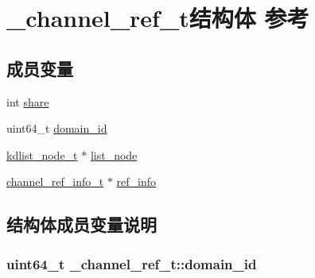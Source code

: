 \hypertarget{a00005}{}\section{\+\_\+channel\+\_\+ref\+\_\+t结构体 参考}
\label{a00005}
\subsection*{成员变量}
\begin{DoxyCompactItemize}
\item 
int \hyperlink{a00005_a6fbc267d43e4e1b98e5dbbbd25fc77f5_a6fbc267d43e4e1b98e5dbbbd25fc77f5}{share}
\item 
uint64\+\_\+t \hyperlink{a00005_a2d8872b940a96f84e2f704ac3d4a1197_a2d8872b940a96f84e2f704ac3d4a1197}{domain\+\_\+id}
\item 
\hyperlink{a00056_ac701f00a0851c97467ae35c382b316b7_ac701f00a0851c97467ae35c382b316b7}{kdlist\+\_\+node\+\_\+t} $\ast$ \hyperlink{a00005_a57f667254f0f5d0fea05d491f220d5ff_a57f667254f0f5d0fea05d491f220d5ff}{list\+\_\+node}
\item 
\hyperlink{a00053_a3c8048d6abb647710be83f9b243c7822_a3c8048d6abb647710be83f9b243c7822}{channel\+\_\+ref\+\_\+info\+\_\+t} $\ast$ \hyperlink{a00005_ab5214b13df76bc824cd4c590976fe804_ab5214b13df76bc824cd4c590976fe804}{ref\+\_\+info}
\end{DoxyCompactItemize}


\subsection{结构体成员变量说明}
\hypertarget{a00005_a2d8872b940a96f84e2f704ac3d4a1197_a2d8872b940a96f84e2f704ac3d4a1197}{}
\subsubsection[{domain\+\_\+id}]{\setlength{\rightskip}{0pt plus 5cm}uint64\+\_\+t \+\_\+channel\+\_\+ref\+\_\+t\+::domain\+\_\+id}\label{a00005_a2d8872b940a96f84e2f704ac3d4a1197_a2d8872b940a96f84e2f704ac3d4a1197}
\hypertarget{a00005_a57f667254f0f5d0fea05d491f220d5ff_a57f667254f0f5d0fea05d491f220d5ff}{}
